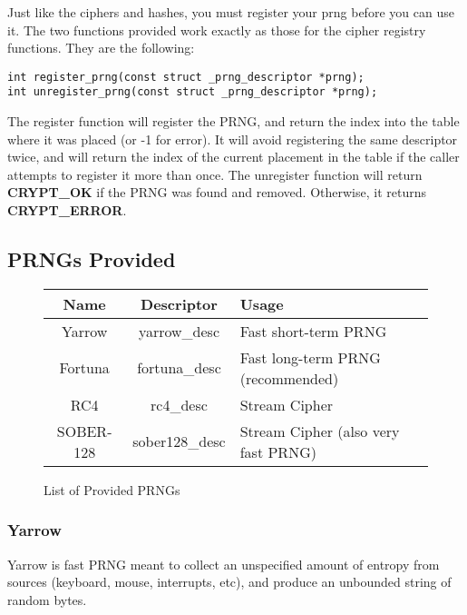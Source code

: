 \documentclass[synpaper]{book}
\begin{document}
Just like the ciphers and hashes, you must register your prng before you can use it.  The two functions provided work exactly as those for the cipher registry functions.  
They are the following:
 
\begin{verbatim}
int register_prng(const struct _prng_descriptor *prng);
int unregister_prng(const struct _prng_descriptor *prng);
\end{verbatim}

The register function will register the PRNG, and return the index into the table where it was placed (or -1 for error).  It will avoid registering the same
descriptor twice, and will return the index of the current placement in the table if the caller attempts to register it more than once.  The unregister function
will return \textbf{CRYPT\_OK} if the PRNG was found and removed.  Otherwise, it returns \textbf{CRYPT\_ERROR}.

\subsection{PRNGs Provided}
\begin{figure}[here]
\begin{center}
\begin{small}
\begin{tabular}{|c|c|l|}
\hline \textbf{Name} & \textbf{Descriptor} & \textbf{Usage} \\
\hline Yarrow & yarrow\_desc & Fast short-term PRNG \\
\hline Fortuna & fortuna\_desc & Fast long-term PRNG (recommended) \\
\hline RC4 & rc4\_desc & Stream Cipher \\
\hline SOBER-128 & sober128\_desc & Stream Cipher (also very fast PRNG) \\
\hline
\end{tabular}
\end{small}
\end{center}
\caption{List of Provided PRNGs}
\end{figure}

\subsubsection{Yarrow}
Yarrow is fast PRNG meant to collect an unspecified amount of entropy from sources 
(keyboard, mouse, interrupts, etc), and produce an unbounded string of random bytes.  
\end{document}
